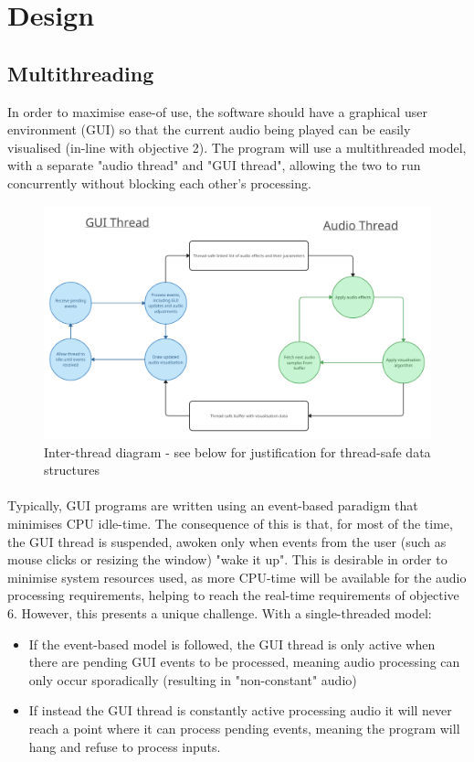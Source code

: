 \section { Design }

\subsection{Multithreading}
In order to maximise ease-of use, the software should have a graphical user environment (GUI) so that the current audio being played can be easily visualised (in-line with objective 2). The program will use a multithreaded model, with a separate "audio thread" and "GUI thread", allowing the two to run concurrently without blocking each other's processing.

\begin{figure}[h]
	\includegraphics[width=17cm]{threading}
	\caption{Inter-thread diagram - see below for justification for thread-safe data structures}
\end{figure}

\paragraph{}
Typically, GUI programs are written using an event-based paradigm that minimises CPU idle-time. The consequence of this is that, for most of the time, the GUI thread is suspended, awoken only when events from the user (such as mouse clicks or resizing the window) "wake it up". This is desirable in order to minimise system resources used, as more CPU-time will be available for the audio processing requirements, helping to reach the real-time requirements of objective 6. However, this presents a unique challenge. With a single-threaded model:
\begin{itemize}
	\item If the event-based model is followed, the GUI thread is only active when there are pending GUI events to be processed, meaning audio processing can only occur sporadically (resulting in "non-constant" audio)
	\item If instead the GUI thread is constantly active processing audio it will never reach a point where it can process pending events, meaning the program will hang and refuse to process inputs.
\end{itemize}

